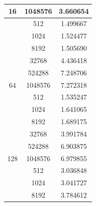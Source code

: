 \begin{enumerate}[\bfseries (a), wide, labelwidth=!, labelindent=0pt]
\begin{table}[h]
\begin{tabular}{|c|c|c|}
\multirow{-6}{*}{16}   & 1048576                                       & {\color[HTML]{434343} 3.660654}       \\ \hline
                       & {\color[HTML]{434343} 512}                    & {\color[HTML]{434343} 1.499667}       \\ \cline{2-3} 
                       & 1024                                          & {\color[HTML]{434343} 1.524477}       \\ \cline{2-3} 
                       & 8192                                          & {\color[HTML]{434343} 1.505690}       \\ \cline{2-3} 
                       & 32768                                         & {\color[HTML]{434343} 4.436418}       \\ \cline{2-3} 
                       & 524288                                        & {\color[HTML]{434343} 7.248706}       \\ \cline{2-3} 
\multirow{-6}{*}{64}   & 1048576                                       & {\color[HTML]{434343} 7.272318}       \\ \hline
                       & {\color[HTML]{434343} 512}                    & {\color[HTML]{434343} 1.535247}       \\ \cline{2-3} 
                       & 1024                                          & {\color[HTML]{434343} 1.641065}       \\ \cline{2-3} 
                       & 8192                                          & {\color[HTML]{434343} 1.689175}       \\ \cline{2-3} 
                       & 32768                                         & {\color[HTML]{434343} 3.991784}       \\ \cline{2-3} 
                       & 524288                                        & {\color[HTML]{434343} 6.903875}       \\ \cline{2-3} 
\multirow{-6}{*}{128}  & 1048576                                       & {\color[HTML]{434343} 6.979855}       \\ \hline
                       & {\color[HTML]{434343} 512}                    & {\color[HTML]{434343} 3.036848}       \\ \cline{2-3} 
                       & 1024                                          & {\color[HTML]{434343} 3.041727}       \\ \cline{2-3} 
                       & 8192                                          & {\color[HTML]{434343} 3.784612}       \\ \cline{2-3} 

\end{tabular}
\end{table}
\end{enumerate}
